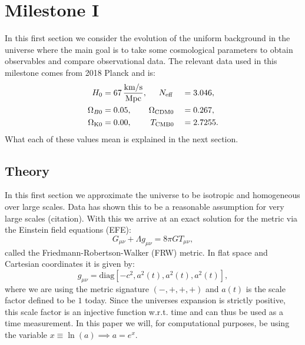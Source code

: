 \documentclass[%
reprint,
 amsmath,amssymb,
 aps,
]{revtex4-2}
\begin{document}
\section{Milestone I}

In this first section we consider the evolution of the uniform background in the universe where the main goal is to take some cosmological parameters to obtain observables and compare observational data. The relevant data used in this milestone comes from 2018 Planck \cite{2020} and is:
\begin{alignat*}{2}
	H_0 &= 67\,\frac{\text{km/s}}{\text{Mpc}},\hspace{5mm}N_\text{eff}&&=3.046,\\
	\Omega_{B0}&=0.05,\hspace{7.3mm}\Omega_{\text{CDM}0}&&=0.267,\\
	\Omega_{\text K0}&=0.00,\hspace{8mm}T_{\text{CMB}0}&&=2.7255.
\end{alignat*}
What each of these values mean is explained in the next section.

\subsection{Theory}
In this first section we approximate the universe to be isotropic and homogeneous over large scales. Data has shown this to be a reasonable assumption for very large scales (citation). With this we arrive at an exact solution for the metric via the Einstein field equations (EFE):
\begin{equation}
	G_{\mu\nu}+\Lambda g_{\mu\nu}=8\pi G T_{\mu\nu},\label{EFE}
\end{equation}
called the Friedmann-Robertson-Walker (FRW) metric. In flat space and Cartesian coordinates it is given by:
\[g_{\mu\nu}=\text{diag}[-c^2,a^2(t),a^2(t),a^2(t)],\]
where we are using the metric signature $(-,+,+,+)$ and $a(t)$ is the scale factor defined to be $1$ today. Since the universes expansion is strictly positive, this scale factor is an injective function w.r.t. time and can thus be used as a time measurement. In this paper we will, for computational purposes, be using the variable $x\equiv\ln(a)\implies a=e^x$. 
\end{document}
